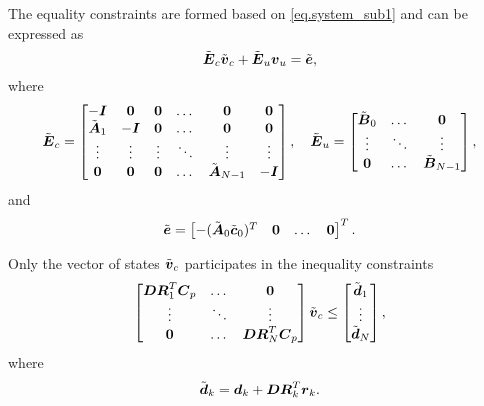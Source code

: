 The equality constraints are formed based on \cref{eq.system_sub1} and can be expressed as
\begin{equation}\label{eq.constr_vect}
\tilde{\mbm{E}}_c\tilde{\mbm{v}}_c + \tilde{\mbm{E}}_u\mbm{v}_u = \tilde{\mbm{e}},
\end{equation}
where
$$
  \tilde{\mbox{\boldmath $E$}}_c =
    \begin{bmatrix} 
      -\mbox{\boldmath $I$}           &  \mbox{\boldmath $0$} &  \mbox{\boldmath $0$} & \dots  & \mbox{\boldmath $0$}               & \mbox{\boldmath $0$}  \\
       \tilde{\mbox{\boldmath $A$}}_1 & -\mbox{\boldmath $I$} &  \mbox{\boldmath $0$} & \dots  & \mbox{\boldmath $0$}               & \mbox{\boldmath $0$}  \\
       \vdots            &  \vdots  &  \vdots  & \ddots & \vdots                & \vdots   \\
       \mbox{\boldmath $0$}           &  \mbox{\boldmath $0$} &  \mbox{\boldmath $0$} & \dots  & \tilde{\mbox{\boldmath $A$}}_{N-1} & -\mbox{\boldmath $I$} \\
    \end{bmatrix}, \quad
  \tilde{\mbox{\boldmath $E$}}_u =
    \begin{bmatrix} 
      \tilde{\mbox{\boldmath $B$}}_0 & \dots  & \mbox{\boldmath $0$} \\
      \vdots     & \ddots & \vdots  \\
      \mbox{\boldmath $0$}    & \dots  & \tilde{\mbox{\boldmath $B$}}_{N-1} \\
    \end{bmatrix},
$$
and 
$$
\tilde{\mbox{\boldmath $e$}} = 
\begin{bmatrix}
    -(\tilde{\mbox{\boldmath $A$}}_0 \tilde{\mbox{\boldmath $c$}}_0)^T & \mbox{\boldmath $0$} & \dots & \mbox{\boldmath $0$}
\end{bmatrix}^T.
$$

Only the vector of states $\tilde{\mbox{\boldmath $v$}}_c$ participates in the inequality constraints
$$
\begin{bmatrix} 
   \mbox{\boldmath $D$}\mbox{\boldmath $R$}^T_1\mbox{\boldmath $C$}_p & \dots  & \mbox{\boldmath $0$}                     \\
   \vdots                      & \ddots & \vdots                      \\
   \mbox{\boldmath $0$}                     & \dots  & \mbox{\boldmath $D$}\mbox{\boldmath $R$}^T_N\mbox{\boldmath $C$}_p \\
\end{bmatrix}
\tilde{\mbox{\boldmath $v$}}_c \leq
\begin{bmatrix} 
    \tilde{\mbox{\boldmath $d$}}_1\\
    \vdots \\
    \tilde{\mbox{\boldmath $d$}}_N\\
\end{bmatrix},
$$
where
$$
\tilde{\mbox{\boldmath $d$}}_k = \mbox{\boldmath $d$}_k + \mbox{\boldmath $D$}\mbox{\boldmath $R$}^T_k\mbox{\boldmath $r$}_k.
$$



